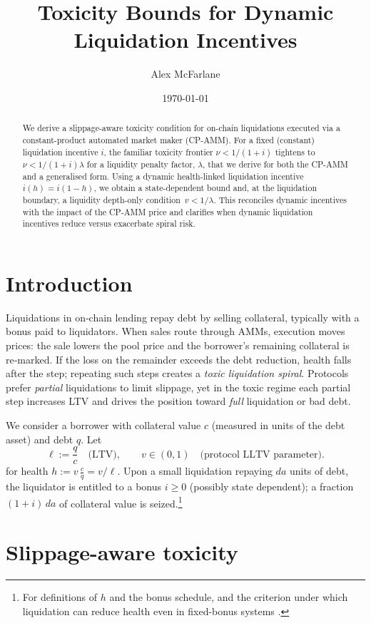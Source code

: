 \documentclass[11pt]{article}
\title{Toxicity Bounds for Dynamic Liquidation Incentives}
\author{Alex McFarlane}
\date{\today}
\begin{document}
\maketitle

\begin{abstract}
We derive a slippage-aware toxicity condition for on-chain liquidations executed via a constant-product automated market maker (CP-AMM). For a fixed (constant) liquidation incentive \(i\), the familiar toxicity frontier \( \nu < 1/(1+i) \) tightens to
\(\nu < 1/(1+i)\lambda\) for a liquidity penalty factor, \(\lambda\), that we derive for both the CP-AMM and a generalised form. Using a dynamic health-linked liquidation incentive \(i(h) = i(1 - h)\), we obtain a state-dependent bound and, at the liquidation boundary, a liquidity depth-only condition \( \,v < 1/\lambda\). This reconciles dynamic incentives with the impact of the CP-AMM price and clarifies when dynamic liquidation incentives reduce versus exacerbate spiral risk.
\end{abstract}

\section{Introduction}
Liquidations in on‑chain lending repay debt by selling collateral, typically with a bonus paid to liquidators. When sales route through AMMs, execution moves prices: the sale lowers the pool price and the borrower’s remaining collateral is re‑marked. If the loss on the remainder exceeds the debt reduction, health falls after the step; repeating such steps creates a \emph{toxic liquidation spiral}. Protocols prefer \emph{partial} liquidations to limit slippage, yet in the toxic regime each partial step increases LTV and drives the position toward \emph{full} liquidation or bad debt.

We consider a borrower with collateral value \(c\) (measured in units of the debt asset) and debt \(q\). Let
\[
\ell := \frac{q}{c} \quad \text{(LTV)}, 
\qquad v \in (0,1) \quad \text{(protocol LLTV parameter)}.
\]
for health \( h := v\,\frac{c}{q} = v/\ell \). Upon a small liquidation repaying \(da\) units of debt, the liquidator is entitled to a bonus \(i \ge 0\) (possibly state dependent); a fraction \((1+i)\,da\) of collateral value is seized.\footnote{For definitions of \(h\) and the bonus schedule, and the criterion under which liquidation can reduce health even in fixed-bonus systems \cite{Bentley}.}

\section{Slippage-aware toxicity}
\end{document}
